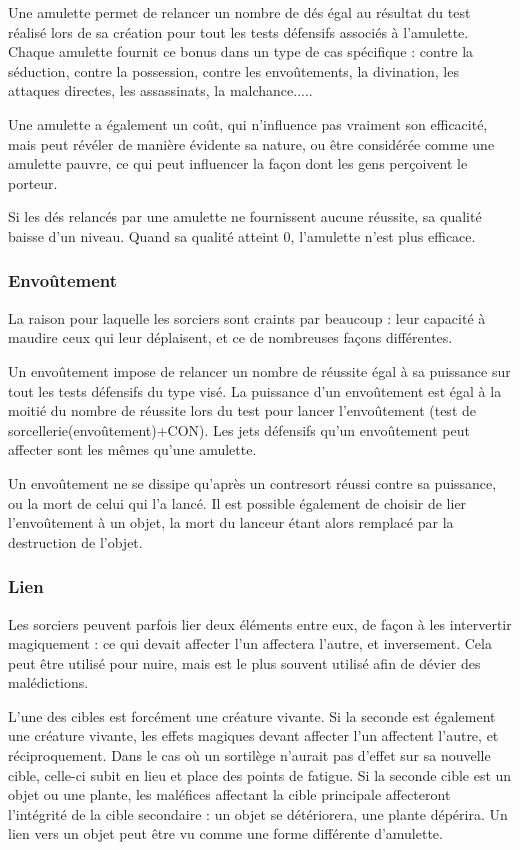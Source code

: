 \documentclass[10pt,a4paper,twocolumn]{book}
\begin{document}
Une amulette permet de relancer un nombre de dés égal au résultat du test réalisé lors de sa création pour tout les tests défensifs associés à l'amulette. Chaque amulette fournit ce bonus dans un type de cas spécifique : contre la séduction, contre la possession, contre les envoûtements, la divination, les attaques directes, les assassinats, la malchance..... 

Une amulette a également un coût, qui n'influence pas vraiment son efficacité, mais peut révéler de manière évidente sa nature, ou être considérée comme une amulette pauvre, ce qui peut influencer la façon dont les gens perçoivent le porteur.

Si les dés relancés par une amulette ne fournissent aucune réussite, sa qualité baisse d'un niveau. Quand sa qualité atteint 0, l'amulette n'est plus efficace. 
\subsubsection{Envoûtement}
La raison pour laquelle les sorciers sont craints par beaucoup : leur capacité à maudire ceux qui leur déplaisent, et ce de nombreuses façons différentes.

Un envoûtement impose de relancer un nombre de réussite égal à sa puissance sur tout les tests défensifs du type visé. La puissance d'un envoûtement est égal à la moitié du nombre de réussite lors du test pour lancer l'envoûtement (test de sorcellerie(envoûtement)+CON). Les jets défensifs qu'un envoûtement peut affecter sont les mêmes qu'une amulette.

Un envoûtement ne se dissipe qu'après un contresort réussi contre sa puissance, ou la mort de celui qui l'a lancé. Il est possible également de choisir de lier l'envoûtement à un objet, la mort du lanceur étant alors remplacé par la destruction de l'objet.
\subsubsection{Lien}
Les sorciers peuvent parfois lier deux éléments entre eux, de façon à les intervertir magiquement : ce qui devait affecter l'un affectera l'autre, et inversement. Cela peut être utilisé pour nuire, mais est le plus souvent utilisé afin de dévier des malédictions.

L'une des cibles est forcément une créature vivante.
Si la seconde est également une créature vivante, les effets magiques devant affecter l'un affectent l'autre, et réciproquement. Dans le cas où un sortilège n'aurait pas d'effet sur sa nouvelle cible, celle-ci subit en lieu et place des points de fatigue.
Si la seconde cible est un objet ou une plante, les maléfices affectant la cible principale affecteront l'intégrité de la cible secondaire : un objet se détériorera, une plante dépérira. Un lien vers un objet peut être vu comme une forme différente d'amulette. 
\end{document}
